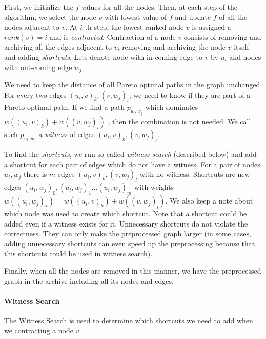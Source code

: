 First, we initialize the $f$ values for all the nodes. Then, at each step of
the algorithm, we select the node $v$ with lowest value of $f$ and update $f$
of all the nodes adjacent to $v$.  At $i$-th step, the lowest-ranked node $v$
is assigned a $rank(v) = i$ and is \emph{contracted}.  Contraction of a node
$v$ consists of removing and archiving all the edges adjacent to $v$, removing
and archiving the node $v$ itself and adding {\em shortcuts}. Lets denote
node with in-coming edge to $v$ by $u_i$ and nodes with out-coming edge $w_j$.

\vskip 5mm
We need to keep the distance of all Pareto optimal paths in the graph
unchanged. For every two edges $(u_i,v)_k,(v,w_j)_l$, we need to know if they
are part of a Pareto optimal path. If we find a path $p_{u_i,w_j}$ which
dominates $w((u_i,v)_k)+w((v,w_j)_l)$ , then the combination is not needed. We
call such $p_{u_i,w_j}$ a \emph{witness} of edges $(u_i,v)_k,(v,w_j)_l$. 

To find the {\em shortcuts}, we run so-called {\em witness search} (described
below) and add a shortcut for each pair of edges which do not have a witness.
For a pair of nodes $u_i, w_j$ there is $m$ edges $(u_i,v)_k,(v,w_j)_l$
with no witness. Shortcuts are new edges
$(u_i,w_j)_0, (u_i,w_j)_1 \dots (u_i,w_j)_m$ 
with weights $w((u_i,w_j)_*) = w((u_i,v)_k)+w((v,w_j)_l)$.  We also keep a note
about which node was used to create which shortcut.  Note that a shortcut could
be added even if a witness exists for it. Unnecessary shortcuts do not violate
the correctness. They can only make the preprocessed graph larger (in some
cases, adding unnecessary shortcuts can even speed up the preprocessing
because that this shortcuts could be used in witness search). 


Finally, when all the nodes are removed in this manner, we have the
preprocessed graph in the archive including all its nodes and edges.

\paragraph*{Witness Search} The Witness Search is used to determine which
shortcuts we need to add when we contracting a node $v$. 

